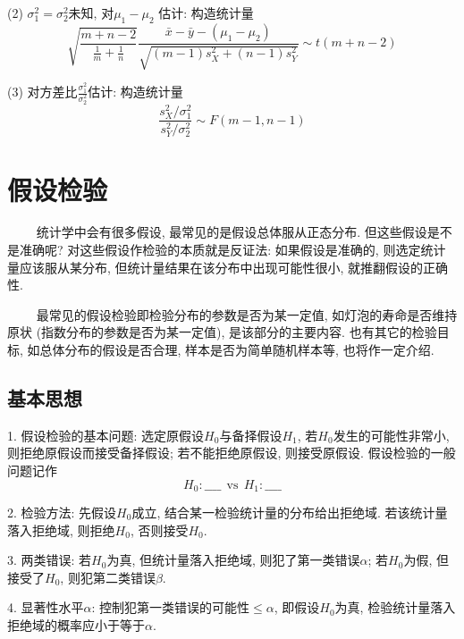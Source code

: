 (2) $\sigma_1^2=\sigma_2^2$未知, 对$\mu_1-\mu_2$ 估计: 构造统计量
\begin{equation*}
    \sqrt{\frac{m+n-2}{\frac{1}{m}+\frac{1}{n}}} \frac{\bar{x}-\bar{y}-(\mu_1-\mu_2)}{\sqrt{(m-1)s_X^2+(n-1)s_Y^2}} \sim t(m+n-2)
\end{equation*}

(3) 对方差比$\frac{\sigma_1^2}{\sigma_2^2}$估计: 构造统计量
\begin{equation*}
    \frac{s_X^2/\sigma_1^2}{s_Y^2/\sigma_2^2} \sim F(m-1,n-1)
\end{equation*}

\section{假设检验}

\begin{tcolorbox}[colback=red!5,colframe=red!75!black]
    ~~~~ 统计学中会有很多假设, 最常见的是假设总体服从正态分布. 但这些假设是不是准确呢? 对这些假设作检验的本质就是反证法: 如果假设是准确的, 则选定统计量应该服从某分布, 但统计量结果在该分布中出现可能性很小, 就推翻假设的正确性.

    ~~~~ 最常见的假设检验即检验分布的参数是否为某一定值, 如灯泡的寿命是否维持原状 (指数分布的参数是否为某一定值), 是该部分的主要内容. 也有其它的检验目标, 如总体分布的假设是否合理, 样本是否为简单随机样本等, 也将作一定介绍. 
\end{tcolorbox}

\subsection{基本思想}

1. 假设检验的基本问题: 选定原假设$H_0$与备择假设$H_1$, 若$H_0$发生的可能性非常小, 则拒绝原假设而接受备择假设; 若不能拒绝原假设, 则接受原假设. 假设检验的一般问题记作
\begin{equation*}
    H_0: \_\_\_\_  \ \ \text{vs}\ \ H_1:\_\_\_\_
\end{equation*}

2. 检验方法: 先假设$H_0$成立, 结合某一检验统计量的分布给出拒绝域. 若该统计量落入拒绝域, 则拒绝$H_0$, 否则接受$H_0$.

3. 两类错误: 若$H_0$为真, 但统计量落入拒绝域, 则犯了第一类错误$\alpha$; 若$H_0$为假, 但接受了$H_0$, 则犯第二类错误$\beta$.

4. 显著性水平$\alpha$: 控制犯第一类错误的可能性$\leq \alpha$, 即假设$H_0$为真, 检验统计量落入拒绝域的概率应小于等于$\alpha$.

